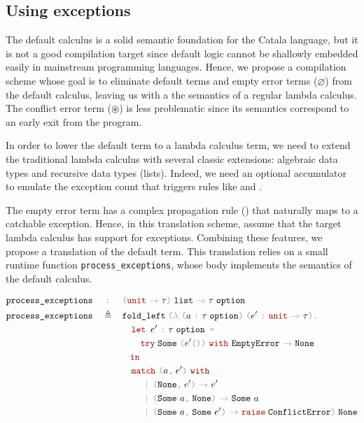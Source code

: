 \documentclass[11pt,a4paper]{article}
\newcommand{\synvar}[1]{\ensuremath{#1}}
\newcommand{\synkeyword}[1]{\textcolor{red!60!black}{\texttt{#1}}}
\newcommand{\synpunct}[1]{\textcolor{black!40!white}{\texttt{#1}}}
\newcommand{\synlet}{\synkeyword{let~}}
\newcommand{\synin}{\synkeyword{~in~}}
\newcommand{\synequal}{\synpunct{~=~}}
\newcommand{\syntyped}{~\synpunct{:}~}
\newcommand{\syncomma}{\synpunct{,}}
\newcommand{\syndot}{\synpunct{.}~}
\newcommand{\synunit}{\synpunct{()}}
\newcommand{\synunitt}{\synkeyword{unit}}
\newcommand{\synlambda}{\synpunct{$\lambda$}~}
\newcommand{\synlparen}{\synpunct{(}}
\newcommand{\synrparen}{\synpunct{)}}
\newcommand{\synmid}{\synpunct{~$|$~}}
\newcommand{\synemptydefault}{\synvar{\varnothing}}
\newcommand{\synerror}{\synvar{\circledast}}
\newcommand{\synarrow}{~\synpunct{$\rightarrow$}~}
\newcommand{\synnone}{\texttt{None}}
\newcommand{\synsome}{\texttt{Some}~}
\newcommand{\synmatch}{\synkeyword{match}~}
\newcommand{\synwith}{~\synkeyword{with}~}
\newcommand{\synoption}{\;\texttt{option}}
\newcommand{\synraise}{\synkeyword{raise}\;}
\newcommand{\synemptyerror}{\texttt{EmptyError}}
\newcommand{\synconflicterror}{\texttt{ConflictError}}
\newcommand{\syntry}{\synkeyword{try}\;}
\newcommand{\synlist}{\;\texttt{list}}
\begin{document}
\subsection{Using exceptions}

The default calculus is a solid semantic foundation for the Catala language,
but it is not a good compilation target since default logic cannot be shallowly
embedded easily in mainstream programming languages. Hence, we propose a
compilation scheme whose goal is to eliminate default terms and empty error 
terms (\synemptydefault) from the default calculus, leaving us with a the semantics of a
regular lambda calculus. The conflict error term (\synerror) is less problematic 
since its semantics correspond to an early exit from the program.

In order to lower the default term to a lambda calculus term, we need to extend 
the traditional lambda calculus with several classic extensions: algebraic 
data types and recursive data types (lists). Indeed, we need an optional 
accumulator to emulate the exception count that triggers rules like
 and .

The empty error term has a complex propagation rule ()
that naturally maps to a catchable exception. Hence, in this translation scheme,
assume that the target lambda calculus has support for exceptions. Combining these 
features, we propose a translation of the default term. This translation relies 
on a small runtime function \texttt{process\_exceptions}, whose body 
implements the semantics of the default calculus. 


\begin{align*}
  \texttt{process\_exceptions}\quad&\syntyped&&
  \synlparen\synunitt\synarrow\synvar{\tau}\synrparen\synlist\synarrow\synvar{\tau}\synoption\\
  \texttt{process\_exceptions}\quad&\triangleq&&
  \texttt{fold\_left}\;\synlparen\synlambda\synlparen\synvar{a}\syntyped
  \synvar{\tau}\synoption\synrparen\;
  \synlparen\synvar{e'}\syntyped
  \synunitt\synarrow\synvar{\tau}\synrparen\syndot\\
  &&&\quad\synlet\synvar{e'}\syntyped\synvar{\tau}\synoption\synequal\\
  &&&\quad\quad\syntry
  \synsome\synlparen\synvar{e'}\synunit\synrparen
  \synwith\synemptyerror\synarrow \synnone\\
  &&&\quad\!\!\!\!\synin\\
  &&&\quad\synmatch\synlparen\synvar{a}\syncomma\;\synvar{e'}\synrparen\synwith\\
  &&&\quad\quad\synmid\synlparen\synnone\syncomma\;\synvar{e'}\synrparen\synarrow\synvar{e'}\\
  &&&\quad\quad\synmid\synlparen\synsome\synvar{a}\syncomma\;\synnone\synrparen\synarrow
  \synsome\synvar{a}\\
  &&&\quad\quad\synmid\synlparen\synsome\synvar{a}\syncomma\;\synsome
  \synvar{e'}\synrparen\synarrow \synraise\synconflicterror \synrparen\;\synnone
\end{align*}
\end{document}
